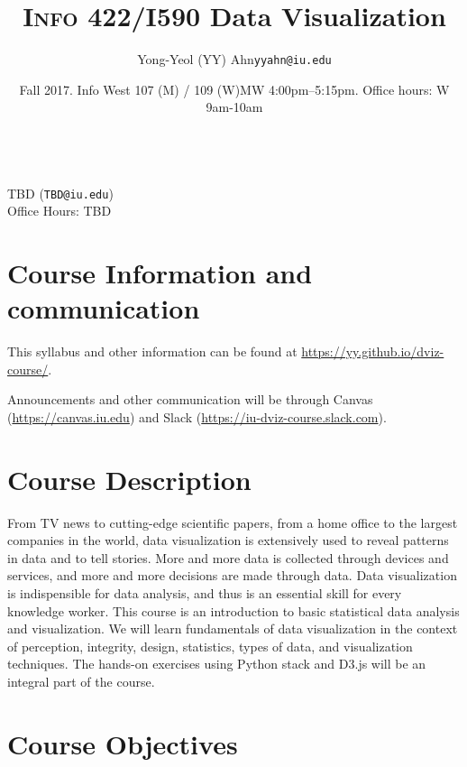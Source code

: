 \documentclass[11pt,article,oneside]{memoir} %
\makeatletter
\def\myauthor{Author}
\def\mytitle{Title}
\def\myemail{yyahn@iu.edu}
\def\myauthor{Yong-Yeol (YY) Ahn}
\def\mytitle{{\normalsize \textsc{Info} 422/I590 \newline} \HUGE Data Visualization}
\makeatother
\begin{document}

\title{\LARGE \mytitle} %
\author{\Large\myauthor \newline \footnotesize\texttt{\noindent\myemail}}
\date{Fall 2017. Info West 107 (M) / 109 (W)\newline MW 4:00pm--5:15pm. \newline Office hours: W 9am-10am}

\maketitle 

\vspace{-20pt}{\bfseries Assistant Instructor} \\ TBD (\texttt{TBD@iu.edu}) \\ Office Hours: TBD 
\section{Course Information and communication} %

This syllabus and other information can be found at \url{https://yy.github.io/dviz-course/}. 

Announcements and other communication will be through Canvas (\url{https://canvas.iu.edu}) and Slack (\url{https://iu-dviz-course.slack.com}).
\section{Course Description}%

From TV news to cutting-edge scientific papers, from a home office to the
largest companies in the world, data visualization is extensively used to
reveal patterns in data and to tell stories. More and more data is collected
through devices and services, and more and more decisions are made through
data. Data visualization is indispensible for data analysis, and thus is an
essential skill for every knowledge worker.  This course is an introduction to
basic statistical data analysis and visualization.  We will learn fundamentals
of data visualization in the context of perception, integrity, design,
statistics, types of data, and visualization techniques.  The hands-on
exercises using Python stack and D3.js will be an integral part of the course. 
\section{Course Objectives}%
\end{document}
